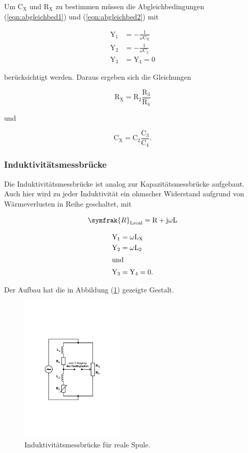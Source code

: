 \noindent
Um $\text{C}_\text{X}$ und $\text{R}_\text{X}$ zu bestimmen müssen die Abgleichbedingungen (\ref{eqn:abgleichbed1}) und (\ref{eqn:abgleichbed2}) mit

\begin{align*}
\text{Y}_1 &= -\frac{1}{\omega\text{C}_\text{X}}\\
\text{Y}_2 &= -\frac{1}{\omega\text{C}_2}\\
\text{Y}_3 &= \text{Y}_4 = 0
\end{align*}

\noindent
berücksichtigt werden.
Daraus ergeben sich die Gleichungen

\begin{equation}
\text{R}_\text{X} = \text{R}_2 \frac{\text{R}_3}{\text{R}_4}
\label{eqn:r_x}
\end{equation}

\noindent
und 

\begin{equation}
\text{C}_\text{X} = \text{C}_2 \frac{\text{C}_3}{\text{C}_4}  .
\label{eqn:c_x}
\end{equation}

\subsubsection{Induktivitätsmessbrücke}
Die Induktivitätsmessbrücke ist analog zur Kapazitätsmessbrücke aufgebaut.
Auch hier wird zu jeder Induktivität ein ohmscher Widerstand aufgrund von Wärmeverlusten in Reihe geschaltet, mit

\begin{equation}
\symfrak{R}_\text{Lreal}= \text{R}+\text{j} \omega \text{L}  
\label{eqn:r_lreal}
\end{equation}

\begin{align*}
\text{Y}_1 &= \omega\text{L}_\text{X}\\
\text{Y}_2 &= \omega\text{L}_2\\
\shortintertext{und}
\text{Y}_3 &= \text{Y}_4 = 0  .
\end{align*}

\noindent
Der Aufbau hat die in Abbildung (\ref{fig:induktiv})
gezeigte Gestalt.

\begin{figure}
            \centering
               \includegraphics[height=7cm]{Bilder/induktiv.pdf}
               \caption{Induktivitätsmessbrücke für reale Spule.}
               \label{fig:induktiv}
        \end{figure}

